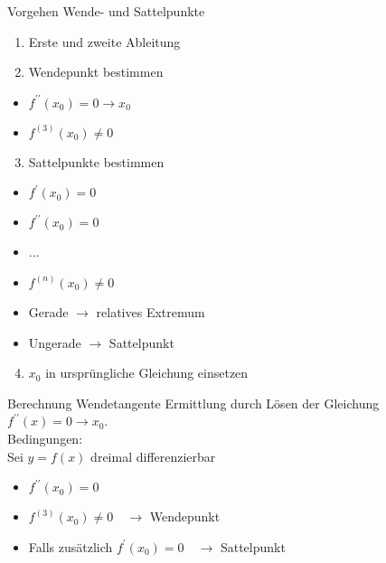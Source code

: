 \begin{KR}{Vorgehen Wende- und Sattelpunkte}
    \begin{enumerate}
  \item Erste und zweite Ableitung

  \item Wendepunkt bestimmen

\end{enumerate}

\begin{itemize}
  \item $f^{\prime \prime}(x_{0})=0 \rightarrow x_{0}$
  \item $f^{(3)}(x_{0}) \neq 0$
\end{itemize}

\begin{enumerate}
  \setcounter{enumi}{2}
  \item Sattelpunkte bestimmen
\end{enumerate}

\begin{itemize}
  \item $f^{\prime}(x_{0})=0$
  \item $f^{\prime \prime}(x_{0})=0$
  \item ...
  \item $f^{(n)}(x_{0}) \neq 0$
  \item Gerade $\rightarrow$ relatives Extremum
  \item Ungerade $\rightarrow$ Sattelpunkt
\end{itemize}

\begin{enumerate}
  \setcounter{enumi}{3}
  \item $x_{0}$ in ursprüngliche Gleichung einsetzen
\end{enumerate}
\end{KR}

\begin{KR}{Berechnung Wendetangente}
    Ermittlung durch Lösen der Gleichung $f^{\prime \prime}(x)=0 \rightarrow x_{0}$.\\
    Bedingungen:\\
    Sei $y=f(x)$ dreimal differenzierbar

\begin{itemize}
  \item $f^{\prime \prime}(x_{0})=0$
  \item $f^{(3)}(x_{0}) \neq 0 \quad \rightarrow$ Wendepunkt
  \item Falls zusätzlich $f^{\prime}(x_{0})=0 \quad \rightarrow$ Sattelpunkt
\end{itemize}
    
\end{KR}

